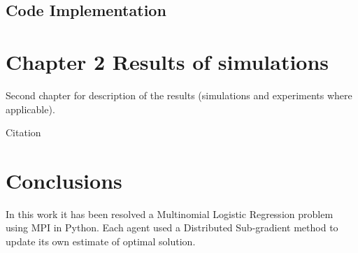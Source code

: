 \documentclass[a4paper,11pt,oneside]{book}
\begin{document}
\section {Code Implementation} \label{Sec1.2}



\chapter{Chapter 2 Results of simulations} \label{Cap2}
Second chapter for description of the results (simulations and experiments where
applicable).



Citation \cite{CITATION:2}



\chapter*{Conclusions} %
In this work it has been resolved a Multinomial Logistic Regression problem using MPI in Python. Each agent used a Distributed Sub-gradient method to update its own estimate of optimal solution.


{}
	
\end{document}
